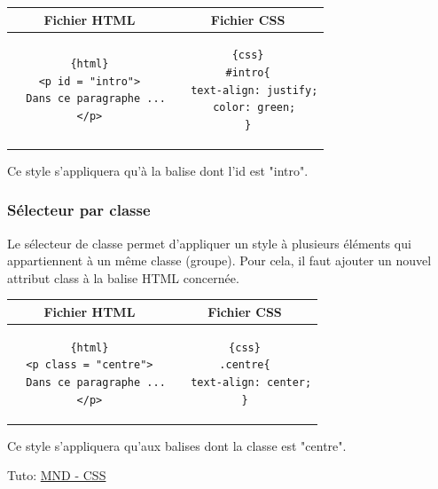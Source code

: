 \documentclass[a4paper,11pt]{article}
\begin{document}
\begin{tabular}{|c|c|}
\hline
\centering Fichier HTML & Fichier CSS\tabularnewline
\hline
\begin{minipage}{1\textwidth}
\begin{verbatim}{html}
<p id = "intro">
  Dans ce paragraphe ...
</p>
\end{verbatim}
\end{minipage}&
\begin{minipage}{1\textwidth}
\begin{verbatim}{css}
#intro{
  text-align: justify;
  color: green;
}
\end{verbatim}
\end{minipage}\tabularnewline
\hline
\end{tabular}\par
Ce style s'appliquera qu'à la balise dont l'id est "intro".

\subsubsection{Sélecteur par classe}
Le sélecteur de classe permet d'appliquer un style à plusieurs éléments qui appartiennent à un même classe (groupe). Pour cela, il faut ajouter un nouvel attribut class à la balise HTML concernée.\par

\begin{tabular}{|c|c|}
\hline
\centering Fichier HTML & Fichier CSS\tabularnewline
\hline
\begin{minipage}{1\textwidth}
\begin{verbatim}{html}
<p class = "centre">
  Dans ce paragraphe ...
</p>
\end{verbatim}
\end{minipage}&
\begin{minipage}{1\textwidth}
\begin{verbatim}{css}
.centre{
  text-align: center;
}
\end{verbatim}
\end{minipage}\tabularnewline
\hline
\end{tabular}\par
Ce style s'appliquera qu'aux balises dont la classe est "centre".

Tuto: \href{https://developer.mozilla.org/fr/docs/Learn/Getting_started_with_the_web/CSS_basics}{MND - CSS}
\end{document}
